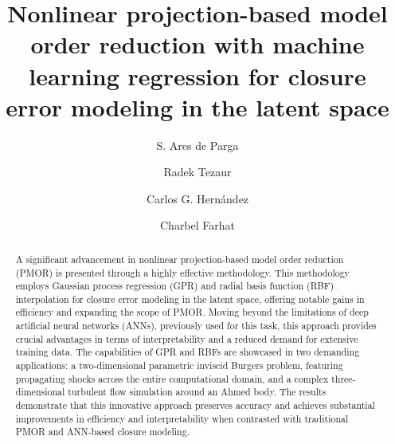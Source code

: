 \documentclass[preprint,10pt]{elsarticle}
\begin{document}
\begin{frontmatter}


\title{Nonlinear projection-based model order reduction with machine learning regression for closure error modeling in the latent space}

\author[upc,cimne]{S. Ares de Parga}
\author[stanaa]{Radek Tezaur}
\author[stanaa]{Carlos G. Hernández}
\author[stanaa,stancme]{Charbel Farhat}


\address[stanaa]{Department of Aeronautics and Astronautics, Stanford University, Stanford, CA 94305, USA}
\address[upc]{Department of Civil and Environmental Engineering, Universitat Polit\`{e}cnica de Catalunya - Barcelona Tech (UPC), Building B0, Campus Nord, Jordi Girona 1-3, Barcelona 08034, Spain}
\address[cimne]{Centre Internacional de M\`{e}todes Num\`{e}rics en Enginyeria (CIMNE), Universitat Polit\`{e}cnica de Catalunya, Building C1, Campus Nord, Jordi Girona 1-3,
Barcelona 08034, Spain}
\address[stancme]{Institute for Computational and Mathematical Engineering, Stanford University, Stanford, CA 94305, USA}

\begin{abstract}
A significant advancement in nonlinear projection-based model order reduction (PMOR) is presented through a highly effective methodology. This methodology employs Gaussian process regression (GPR) 
and radial basis function (RBF) interpolation for closure error modeling in the latent space, offering notable gains in efficiency and expanding the scope of PMOR. Moving beyond the limitations of 
deep artificial neural networks (ANNs), previously used for this task, this approach provides crucial advantages in terms of interpretability and a reduced demand for extensive training data. The 
capabilities of GPR and RBFs are showcased in two demanding applications: a two-dimensional parametric inviscid Burgers problem, featuring propagating shocks across the entire computational domain, 
and a complex three-dimensional turbulent flow simulation around an Ahmed body. The results demonstrate that this innovative approach preserves accuracy and achieves substantial improvements in efficiency 
and interpretability when contrasted with traditional PMOR and ANN-based closure modeling.
\end{abstract}
\end{frontmatter}
\end{document}

